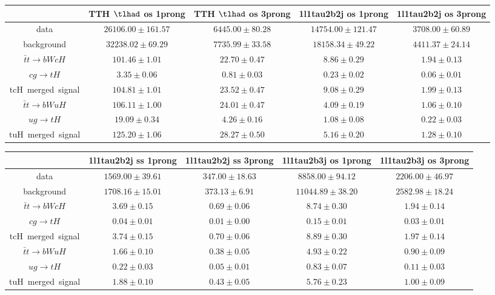 \begin{tabular}{|c|c|c|c|c|} \hline
 & TTH $\tlhad$ os 1prong   & TTH $\tlhad$ os 3prong   & 1l1tau2b2j os 1prong   & 1l1tau2b2j os 3prong  \\\hline
data & $26106.00\pm161.57$ & $6445.00\pm80.28$ & $14754.00\pm121.47$ & $3708.00\pm60.89$\\\hline
background & $32238.02\pm69.29$ & $7735.99\pm33.58$ & $18158.34\pm49.22$ & $4411.37\pm24.14$\\\hline
$\bar{t}t\to bWcH$ & $101.46\pm1.01$ & $22.70\pm0.47$ & $8.86\pm0.29$ & $1.94\pm0.13$\\\hline
$cg\to tH$ & $3.35\pm0.06$ & $0.81\pm0.03$ & $0.23\pm0.02$ & $0.06\pm0.01$\\\hline
tcH~merged~signal & $104.81\pm1.01$ & $23.52\pm0.47$ & $9.08\pm0.29$ & $1.99\pm0.13$\\\hline
$\bar{t}t\to bWuH$ & $106.11\pm1.00$ & $24.01\pm0.47$ & $4.09\pm0.19$ & $1.06\pm0.10$\\\hline
$ug\to tH$ & $19.09\pm0.34$ & $4.26\pm0.16$ & $1.08\pm0.08$ & $0.22\pm0.03$\\\hline
tuH~merged~signal & $125.20\pm1.06$ & $28.27\pm0.50$ & $5.16\pm0.20$ & $1.28\pm0.10$\\\hline
\end{tabular}
\begin{tabular}{|c|c|c|c|c|} \hline
 & 1l1tau2b2j ss 1prong   & 1l1tau2b2j ss 3prong   & 1l1tau2b3j os 1prong   & 1l1tau2b3j os 3prong  \\\hline
data & $1569.00\pm39.61$ & $347.00\pm18.63$ & $8858.00\pm94.12$ & $2206.00\pm46.97$\\\hline
background & $1708.16\pm15.01$ & $373.13\pm6.91$ & $11044.89\pm38.20$ & $2582.98\pm18.24$\\\hline
$\bar{t}t\to bWcH$ & $3.69\pm0.15$ & $0.69\pm0.06$ & $8.74\pm0.30$ & $1.94\pm0.14$\\\hline
$cg\to tH$ & $0.04\pm0.01$ & $0.01\pm0.00$ & $0.15\pm0.01$ & $0.03\pm0.01$\\\hline
tcH~merged~signal & $3.74\pm0.15$ & $0.70\pm0.06$ & $8.89\pm0.30$ & $1.97\pm0.14$\\\hline
$\bar{t}t\to bWuH$ & $1.66\pm0.10$ & $0.38\pm0.05$ & $4.93\pm0.22$ & $0.90\pm0.09$\\\hline
$ug\to tH$ & $0.22\pm0.03$ & $0.05\pm0.01$ & $0.83\pm0.07$ & $0.11\pm0.03$\\\hline
tuH~merged~signal & $1.88\pm0.10$ & $0.43\pm0.05$ & $5.76\pm0.23$ & $1.00\pm0.09$\\\hline
\end{tabular}
